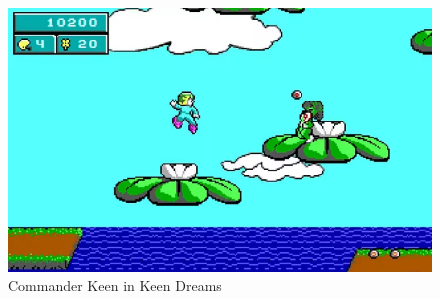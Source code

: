 \documentclass[book.tex]{subfiles}
\begin{document}
\begin{figure}[H]
  \centering
 \includegraphics[width=1.0\textwidth]{screenshots_300dpi/Keen_Dreams.png}
\caption{Commander Keen in Keen Dreams}
\end{figure}
\par
\end{document}
